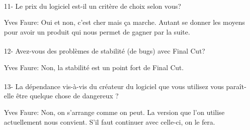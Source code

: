 \paragraph{}
11-  Le prix du logiciel est-il un critère de choix selon vous?

Yves Faure: Oui et non, c'est cher mais ça marche. Autant se donner les moyens pour avoir
un produit qui nous permet de gagner par la suite.

\paragraph{}
12- Avez-vous des problèmes de stabilité (de bugs) avec Final Cut?

Yves Faure: Non, la stabilité est un point fort de Final Cut.

\paragraph{}
13- La dépendance vis-à-vis du créateur du logiciel que vous utilisez
vous paraît-elle être quelque chose de dangereux ?

Yves Faure: Non, on s'arrange comme on peut. La version que l'on utilise actuellement
nous convient. S'il faut continuer avec celle-ci, on le fera.
